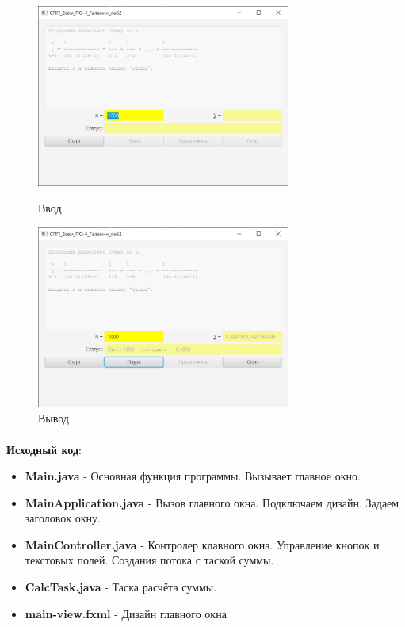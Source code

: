 \documentclass[12pt, a4paper, simple]{eskdtext}
\begin{document}
    \begin{figure}[!h]
        \centering
        \begin{minipage}{0.49\textwidth}
            \centering
            \includegraphics[height=6cm]
                {_assets/input.png}
            \caption{Ввод}
        \end{minipage}
        \begin{minipage}{0.49\textwidth}
            \centering
            \includegraphics[height=6cm]
                {_assets/output.png}
            \caption{Вывод}
        \end{minipage}
    \end{figure}

    \paragraph{} \textbf{Исходный код}: 

    \begin{itemize}
        \item \textbf{Main.java} - Основная функция программы. Вызывает главное окно.
        \item \textbf{MainApplication.java} - Вызов главного окна. Подключаем дизайн. Задаем заголовок окну.
        \item \textbf{MainController.java} - Контролер клавного окна. Управление кнопок и текстовых полей. Создания потока с таской суммы.
        \item \textbf{CalcTask.java} - Таска расчёта суммы.
        \item \textbf{main-view.fxml} - Дизайн главного окна
    \end{itemize}
\end{document}
